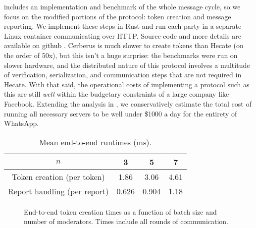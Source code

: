 \documentclass[conference]{IEEEtran}
\begin{document}
\textcite{hecate} includes an implementation and benchmark of the whole message cycle, so we focus on the modified portions of the protocol: token creation and message reporting.
We implement these steps in Rust and run each party in a separate Linux container communicating over HTTP. Source code and more details are available on github \cite{cerberus-github}.
Cerberus is much slower to create tokens than Hecate (on the order of 50x), but this isn't a huge surprise: the benchmarks were run on slower hardware, and the distributed nature of this protocol involves a multitude of verification, serialization, and communication steps that are not required in Hecate.
With that said, the operational costs of implementing a protocol such as this are still \textit{well} within the budgetary constraints of a large company like Facebook. Extending the analysis in \cite{hecate}, we conservatively estimate the total cost of running all necessary servers to be well under \$1000 a day for the entirety of WhatsApp.

\begin{table}[!t]
	\renewcommand{\arraystretch}{1.3}
	\caption{Mean end-to-end runtimes (ms).}
	\label{tab:mean-times}
	\centering\begin{tabular}{c | c c c}
		$n$ & 3     & 5     & 7    \\
		\hline \hline
		Token creation (per token)
		    & 1.86  & 3.06  & 4.61 \\
		Report handling (per report)
		    & 0.626 & 0.904 & 1.18
	\end{tabular}
\end{table}

\begin{figure}[!t]
	\centering
	\footnotesize
	
	\caption{End-to-end token creation times as a function of batch size and number of moderators. Times include all rounds of communication.}
	\label{fig:token-creation}
\end{figure}


\printbibliography
\end{document}
